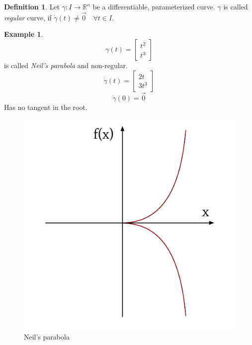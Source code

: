 \documentclass[a4paper,landscape,twocolumn]{article}
\theoremstyle{definition}
\newtheorem{defi}{Definition}
\newtheorem{ex}{Example}
\begin{document}
\begin{defi}
  Let $\gamma: I \to \mathbb R^n$ be a differentiable, parameterized curve.
  $\gamma$ is called \emph{regular} curve, if $\dot\gamma(t) \neq \vec0 \quad \forall t \in I$.
\end{defi}

\begin{ex}
  \[ \gamma(t) = \begin{bmatrix} t^2 \\ t^3 \end{bmatrix} \]
  is called \emph{Neil's parabola} and non-regular.
  \[ \dot\gamma(t) = \begin{bmatrix} 2t \\ 3t^3 \end{bmatrix} \]
  \[ \dot\gamma(0) = \vec0 \]
  Has no tangent in the root.
\end{ex}

\begin{figure}[!h]
  \begin{center}
    \includegraphics{img/neils_parabola.pdf}
    \caption{Neil's parabola}
  \end{center}
\end{figure}
\end{document}
